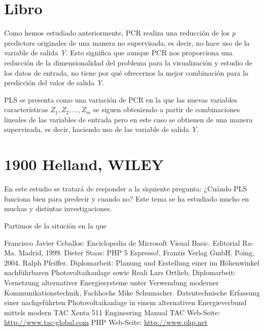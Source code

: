 \documentclass[12pt,a4paper,Spanish]{book}
\begin{document}
\section{Libro}

Como hemos estudiado anteriormente, PCR realiza una reducción de los \textit{p} predictors originales de una manera no supervisada, es decir, no hace uso de la variable de salida \textit{Y}. Esto significa que aunque PCR nos proporciona una reducción de la dimensionalidad del problema para la visualización y estudio de los datos de entrada, no tiene por qué ofrecernos la mejor combinación para la predicción del valor de salida \textit{Y}.

PLS se presenta como una variación de PCR en la que las nuevas variables características $Z_1,Z_2,...,Z_m$ se siguen obteniendo a partir de combinaciones lineales de las variables de entrada pero en este caso se obtienen de una manera supervisada, es decir, haciendo uso de las variable de salida \textit{Y}.


\section{1900 Helland, WILEY}

En este estudio se tratará de responder a la siquiente pregunta: ¿Cuándo PLS funciona bien para predecir y cuando no? Este tema se ha estudiado mucho en muchas y distintas investigaciones.

Partimos de la situción en la que 




\begin{thebibliography}{99}
	 Francisco Javier Ceballos: Enciclopedia de Microsoft 	Visual Basic. Editorial Ra-Ma. Madrid, 1999.
	 Dieter Staas: PHP 5 Espresso!. Franzis Verlag GmbH.
	Poing, 2004.
	 Ralph Pfeiffer. Diplomarbeit: Planung und
	Erstellung einer im Höhenwinkel nachführbaren Photovoltaikanlage
	sowie Reali
	Lars Ortlieb, Diplomarbeit: Vernetzung alternativer
	Energiesysteme unter Verwendung moderner Kommunikationstechnik,
	Fachhochs
	 Mike Schumacher. Datentechnische Erfassung einer
	nachgeführten Photovoltaikanlage in einem alternativen
	Energieverbund mittels modern
	 TAC Xenta 511 Engineering Manual
	 TAC Web-Seite: \url{http://www.tac-global.com}
	 PHP Web-Seite: \url{http://www.php.net}
\end{thebibliography}
\end{document}
